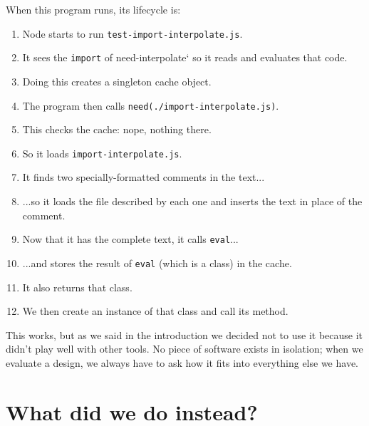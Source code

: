 \documentclass[krantzl]{krantz}
\begin{document}
When this program runs, its lifecycle is:

\begin{enumerate}

\item Node starts to run \texttt{test-import-interpolate.js}.

\item It sees the \texttt{import} of need-interpolate` so it reads and evaluates that code.

\item Doing this creates a singleton cache object.

\item The program then calls \texttt{need({\textquotesingle}./import-interpolate.js{\textquotesingle})}.

\item This checks the cache: nope, nothing there.

\item So it loads \texttt{import-interpolate.js}.

\item It finds two specially-formatted comments in the text...

\item ...so it loads the file described by each one and inserts the text in place of the comment.

\item Now that it has the complete text, it calls \texttt{eval}...

\item ...and stores the result of \texttt{eval} (which is a class) in the cache.

\item It also returns that class.

\item We then create an instance of that class and call its method.

\end{enumerate}


This works,
but as we said in the introduction we decided not to use it
because it didn't play well with other tools.
No piece of software exists in isolation;
when we evaluate a design,
we always have to ask how it fits into everything else we have.

\section{What did we do instead?}\label{file-interpolator-instead}
\end{document}
